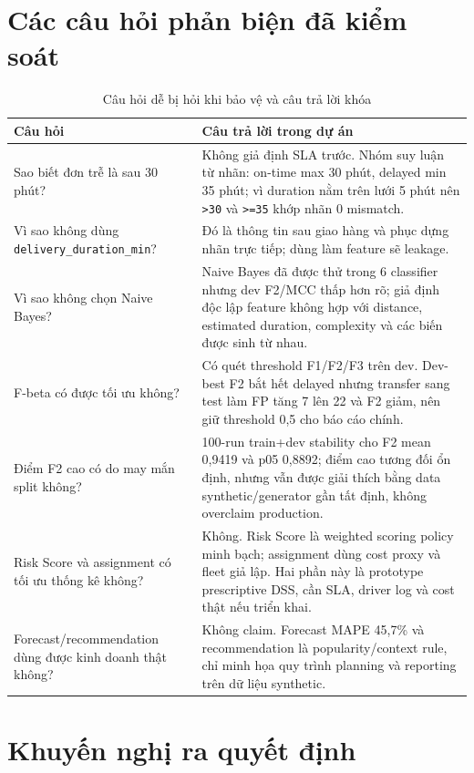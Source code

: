\documentclass[12pt,a4paper,oneside]{report}
\newcommand{\code}[1]{\nolinkurl{#1}}
\begin{document}
\section{Các câu hỏi phản biện đã kiểm soát}

\begin{table}[H]
\centering
\small
\caption{Câu hỏi dễ bị hỏi khi bảo vệ và câu trả lời khóa}
\begin{tabularx}{\textwidth}{p{4.2cm}X}
\toprule
Câu hỏi & Câu trả lời trong dự án\\
\midrule
Sao biết đơn trễ là sau 30 phút? &
Không giả định SLA trước. Nhóm suy luận từ nhãn: on-time max 30 phút, delayed
min 35 phút; vì duration nằm trên lưới 5 phút nên \code{>30} và \code{>=35}
khớp nhãn 0 mismatch.\\
Vì sao không dùng \code{delivery\_duration\_min}? &
Đó là thông tin sau giao hàng và phục dựng nhãn trực tiếp; dùng làm feature sẽ
leakage.\\
Vì sao không chọn Naive Bayes? &
Naive Bayes đã được thử trong 6 classifier nhưng dev F2/MCC thấp hơn rõ; giả
định độc lập feature không hợp với distance, estimated duration, complexity và
các biến được sinh từ nhau.\\
F-beta có được tối ưu không? &
Có quét threshold F1/F2/F3 trên dev. Dev-best F2 bắt hết delayed nhưng transfer
sang test làm FP tăng 7 lên 22 và F2 giảm, nên giữ threshold 0,5 cho báo cáo
chính.\\
Điểm F2 cao có do may mắn split không? &
100-run train+dev stability cho F2 mean 0,9419 và p05 0,8892; điểm cao tương
đối ổn định, nhưng vẫn được giải thích bằng data synthetic/generator gần tất
định, không overclaim production.\\
Risk Score và assignment có tối ưu thống kê không? &
Không. Risk Score là weighted scoring policy minh bạch; assignment dùng cost
proxy và fleet giả lập. Hai phần này là prototype prescriptive DSS, cần SLA,
driver log và cost thật nếu triển khai.\\
Forecast/recommendation dùng được kinh doanh thật không? &
Không claim. Forecast MAPE 45,7\% và recommendation là popularity/context rule,
chỉ minh họa quy trình planning và reporting trên dữ liệu synthetic.\\
\bottomrule
\end{tabularx}
\end{table}

\section{Khuyến nghị ra quyết định}
\end{document}
